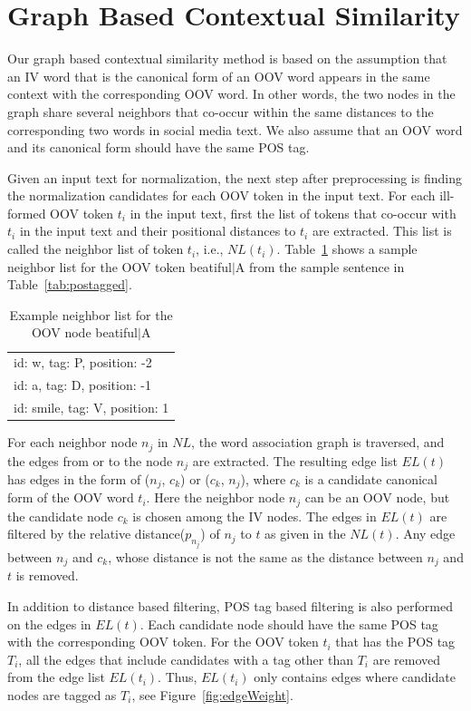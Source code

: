 \documentclass[a4paper,onesided,12pt]{report}
\begin{document}
\section{Graph Based Contextual Similarity}

Our graph based contextual similarity method is based on the assumption that an IV word that is the canonical form of an OOV word appears in the same context with the corresponding OOV word. In other words, the two nodes in the graph share several neighbors that co-occur within the same distances to the corresponding two words in social media text. We also assume that an OOV word and its canonical form should have the same POS tag.

Given an input text for normalization, the next step after preprocessing is finding the normalization candidates for each OOV token in the input text. For each ill-formed OOV token $t_i$ in the input text, first the list of tokens that co-occur with $t_i$ in the input text and their positional distances to $t_i$ are extracted.  This list is called the neighbor list of token $t_i$, i.e.,  $NL(t_i)$. Table~\ref{tab:neigh} shows a sample neighbor list for the OOV token beatiful$|$A from the sample sentence in Table~\ref{tab:postagged}.

\begin{table}[hbt]
  \centering
  \begin{tabular}[tc]{l}
    id: w, tag: P, position: -2 \\
    id: a, tag: D, position: -1 \\
    id: smile, tag: V, position: 1 \\
  \end{tabular}
\caption{Example neighbor list for the OOV node beatiful$|$A}
\label{tab:neigh}
\end{table}

For each neighbor node $n_{j}$ in $NL$, the word association graph is traversed, and the edges from or to the node $n_{j}$ are extracted. The resulting edge list $EL(t)$ has edges in the form of ($n_{j}$, $c_{k}$) or ($c_{k}$, $n_{j}$), where $c_{k}$ is a candidate canonical form of the OOV word $t_i$.
Here the neighbor node $n_{j}$ can be an OOV node, but the candidate node $c_{k}$ is chosen among the IV nodes.
The edges in $EL(t)$ are filtered by the relative distance($p_{n_j}$) of $n_{j}$ to $t$ as given in the $NL(t)$. Any edge between  $n_{j}$ and $c_{k}$, whose distance is not the same as the distance between $n_{j}$ and $t$ is removed.

In addition to distance based filtering, POS tag based filtering is also performed on the edges in $EL(t)$. Each candidate node should have the same POS tag with the corresponding OOV token. For the OOV token $t_i$ that has the POS tag $T_i$, all the edges that include candidates with a tag other than $T_i$ are removed from the edge list $EL(t_{i})$. Thus, $EL(t_{i})$ only contains edges where candidate nodes are tagged as $T_i$, see Figure~\ref{fig:edgeWeight}.
\end{document}
